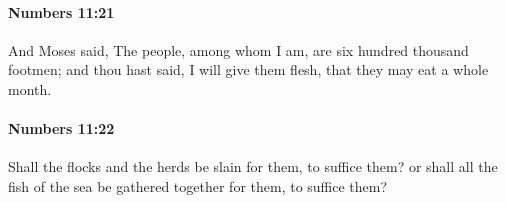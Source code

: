 		\paragraph{Numbers 11:21} %
			\label{NUMBERS-11-21}

			And Moses said, The people, among whom I am, are six hundred thousand footmen; and thou hast said, I will give them flesh, that they may eat a whole month.


		\paragraph{Numbers 11:22} %
			\label{NUMBERS-11-22}

			Shall the flocks and the herds be slain for them, to suffice them? or shall all the fish of the sea be gathered together for them, to suffice them?


